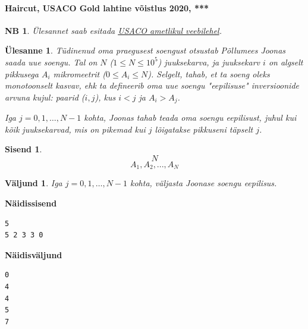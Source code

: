 \documentclass{trkut}
\newtheorem*{extra}{NB}
\newtheorem*{Input}{Sisend}
\newtheorem*{Output}{Väljund}
\newtheorem*{Text}{Ülesanne}
\begin{document}
\paragraph{Haircut, USACO Gold lahtine võistlus 2020, ***}
\begin{extra}
Ülesannet saab esitada \href{http://www.usaco.org/index.php?page=viewproblem2&cpid=1041}{USACO ametlikul veebilehel}.
\end{extra}
\begin{Text}
Tüdinenud oma praegusest soengust otsustab Põllumees Joonas saada uue soengu.  Tal on $N$ ($1\le N\le 10^5$) juuksekarva, ja juuksekarv $i$  on algselt pikkusega $A_i$ mikromeetrit  ($0\le A_i\le N$). Selgelt, tahab, et ta soeng oleks monotoonselt kasvav, ehk ta defineerib oma uue soengu "eepilisuse" inversioonide arvuna kujul: paarid ($i,j$), kus $i<j$ ja $A_i>A_j$.

Iga $j=0,1,…,N−1$ kohta,  Joonas tahab teada oma soengu eepilisust, juhul kui kõik juuksekarvad, mis on pikemad kui $j$ lõigatakse pikkuseni täpselt $j$.

\parencite{26}
\end{Text}

\begin{Input}
\[N\]
\[A_1, A_2, ..., A_N\]

\end{Input}

\begin{Output}
Iga  $j=0,1,…,N−1$ kohta, väljasta Joonase soengu eepilisus.
\end{Output}



\textbf{Näidissisend}

\begin{verbatim}
5
5 2 3 3 0
\end{verbatim}

\textbf{Näidisväljund}

\begin{verbatim}
0
4
4
5
7
\end{verbatim}
\end{document}
